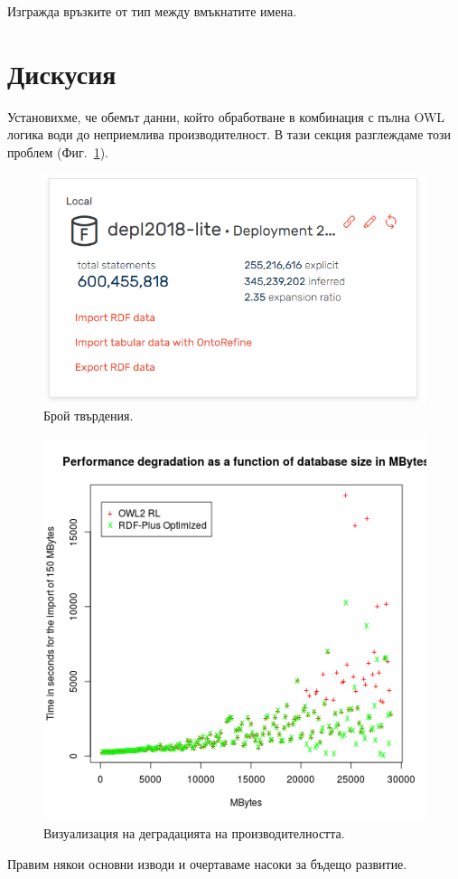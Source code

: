 Изгражда връзките от тип  между вмъкнатите имена.

\section{Дискусия}

Установихме, че обемът данни, който обработване в комбинация с пълна OWL логика води до неприемлива производителност. В тази секция разглеждаме този проблем (Фиг.~\ref{fig:statements-report}).

\begin{figure}
\centering
\includegraphics[width=\textwidth]{Figures/active-repository}
\decoRule
\caption[Statements report]{Брой твърдения.}
\label{fig:statements-report}
\end{figure}

\begin{figure}
\centering
\includegraphics[width=\textwidth]{Figures/performance-degradation-both}
\decoRule
\caption[Performance degradation]{Визуализация на деградацията на производителността.}
\label{fig:performance-degradation}
\end{figure}

Правим някои основни изводи и очертаваме насоки за бъдещо развитие.